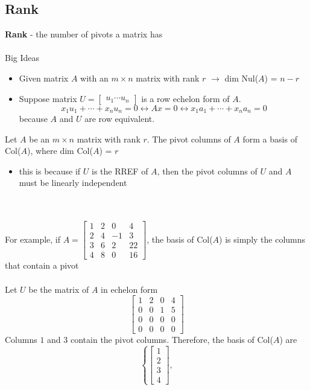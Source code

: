 \begin{enumerate}
\subsection{Rank}
\textbf{Rank} - the number of pivots a matrix has \\\\
Big Ideas
\begin{itemize}
  \item Given matrix $A$ with an $m \times n$ matrix with rank $r$ $\rightarrow$ 
  dim Nul($A$) = $n - r$
  \item Suppose matrix $U = \begin{bmatrix} u_1 \cdots u_n \end{bmatrix}$ 
  is a row echelon form of $A$. 
  \[
    x_1u_1 + \cdots + x_nu_n = 0 \leftrightarrow Ax = 0 
    \leftrightarrow x_1a_1 + \cdots + x_na_n = 0
  \] because $A$ and $U$ are row equivalent.
\end{itemize}
Let $A$ be an $m \times n$ matrix with rank $r$. The pivot columns of $A$ form a basis 
of Col($A$), where dim Col($A$) = $r$
\begin{itemize}
  \item this is because if $U$ is the RREF of $A$, then the pivot columns of $U$ and $A$
  must be linearly independent
\end{itemize} \\\\
For example, if $A = \begin{bmatrix} 1 & 2 & 0 & 4 \\ 2 & 4 & -1 & 3 \\ 3 & 6 & 2 & 22 \\ 
4 & 8 & 0 & 16 \end{bmatrix}$, the basis of Col($A$) is simply the columns that contain a pivot 
\\\\ Let $U$ be the matrix of $A$ in echelon form
\[
  \begin{bmatrix} 1 & 2 & 0 & 4 \\
  0 & 0 & 1 & 5 \\
  0 & 0 & 0 & 0 \\
  0 & 0 & 0 & 0 
  \end{bmatrix}
\]
Columns $1$ and $3$ contain the pivot columns. Therefore, the basis of Col($A$) are 
\[
  \left\{
    \begin{bmatrix} 1 \\ 2 \\ 3 \\ 4 \end{bmatrix},
\]
\end{enumerate}
